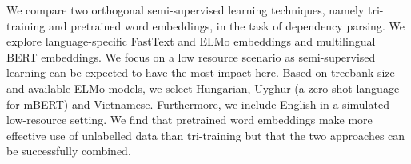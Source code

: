 We compare two orthogonal semi-supervised learning techniques, namely tri-training and pretrained word embeddings, in the task of dependency parsing. We explore language-specific FastText and ELMo embeddings and multilingual BERT embeddings. We focus on a low resource scenario as semi-supervised learning can be expected to have the most impact here. Based on treebank size and available ELMo models, we select Hungarian, Uyghur (a zero-shot language for mBERT) and Vietnamese. Furthermore, we include English in a simulated low-resource setting. We find that pretrained word embeddings make more effective use of unlabelled data than tri-training but that the two approaches can be successfully combined.
